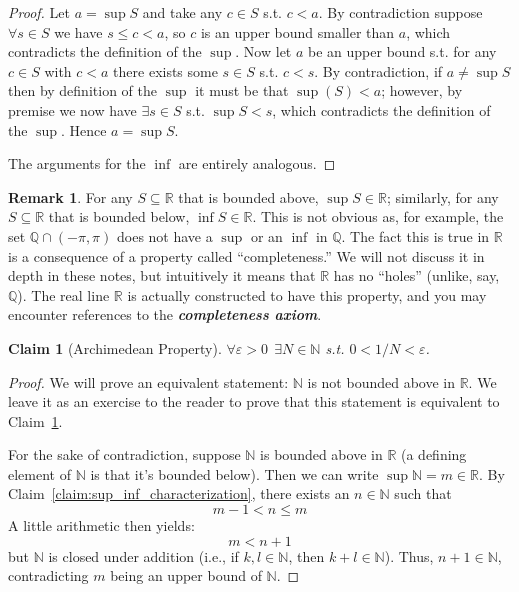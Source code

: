 \documentclass{article}
\newcommand{\R}{\mathbb{R}}
\newcommand{\N}{\mathbb{N}}
\newcommand{\Q}{\mathbb{Q}}
\newcommand{\keyword}[1]{\textit{\textbf{#1}}\index{#1}}
\newtheorem{claim}{Claim}
\theoremstyle{definition}
\newtheorem{remark}{Remark}
\begin{document}
\begin{proof}
  Let $a = \sup S$ and take any $c \in S$ s.t. $c < a$. By contradiction suppose $\forall s \in S$ we have $s \le c < a$, so $c$ is an upper bound smaller than $a$, which contradicts the definition of the $\sup$. Now let $a$ be an upper bound s.t. for any $c \in S$ with $c < a$ there exists some $s \in S$ s.t. $c < s$. By contradiction, if $a \ne \sup S$ then by definition of the $\sup$ it must be that $\sup(S) < a$; however, by premise we now have $\exists s \in S$ s.t. $\sup S < s$, which contradicts the definition of the $\sup$. Hence $a = \sup S$.

  The arguments for the $\inf$ are entirely analogous.
\end{proof}

\begin{remark}
  For any $S \subseteq \R$ that is bounded above, $\sup S \in \R$; similarly, for any $S \subseteq \R$ that is bounded below, $\inf S \in \R$. This is not obvious as, for example, the set $\Q \cap (-\pi, \pi)$ does not have a $\sup$ or an $\inf$ in $\Q$. The fact this is true in $\R$ is a consequence of a property called ``completeness.'' We will not discuss it in depth in these notes, but intuitively it means that $\R$ has no ``holes'' (unlike, say, $\Q$). The real line $\R$ is actually constructed to have this property, and you may encounter references to the \keyword{completeness axiom}.
\end{remark}

\begin{claim}[Archimedean Property]\label{claim:archimedean}
  $\forall \varepsilon > 0 ~~ \exists N \in \N$ s.t. $0 < 1/N < \varepsilon$.
\end{claim}

\begin{proof}
    We will prove an equivalent statement: $\N$ is not bounded above in $\R$. We leave it as an exercise to the reader to prove that this statement is equivalent to Claim~\ref{claim:archimedean}.

    For the sake of contradiction, suppose $\N$ is bounded above in $\R$ (a defining element of $\N$ is that it's bounded below). Then we can write $\sup\N = m \in \R$. By Claim~\ref{claim:sup_inf_characterization}, there exists an $n\in \N$ such that 
    \begin{equation*}
        m-1 < n \leq m
    \end{equation*}
    A little arithmetic then yields:
    \begin{equation*}
        m < n+1
    \end{equation*}
    but $\N$ is closed under addition (i.e., if $k,l\in\N$, then $k+l\in\N$). Thus, $n+1 \in \N$, contradicting $m$ being an upper bound of $\N$. 
\end{proof}
\end{document}
